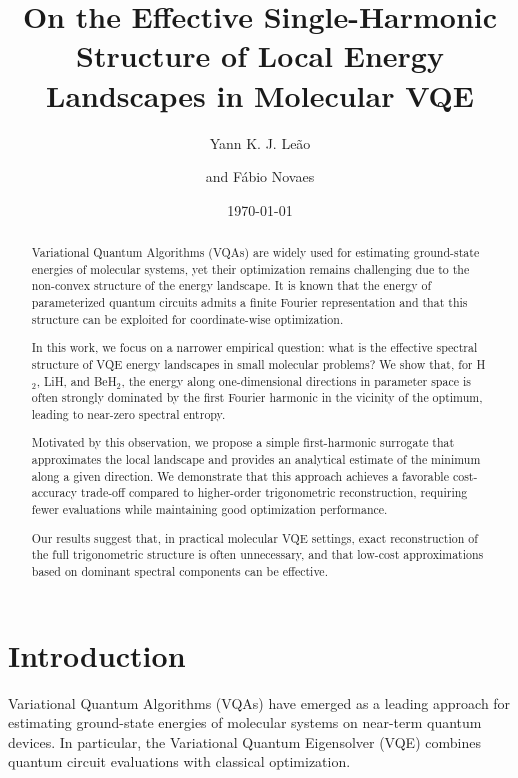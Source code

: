 \documentclass[12pt]{article}
\title{On the Effective Single-Harmonic Structure of Local Energy Landscapes in Molecular VQE}
\author[a]{Yann K. J. Leão}
\affiliation[a]{Academic Unit of Belo Jardim\\ Federal Rural University of Pernambuco}
\author[a]{and Fábio Novaes}
\date{\today}
\begin{document}
\maketitle

\begin{abstract}

Variational Quantum Algorithms (VQAs) are widely used for estimating ground-state energies of molecular systems, yet their optimization remains challenging due to the non-convex structure of the energy landscape. It is known that the energy of parameterized quantum circuits admits a finite Fourier representation and that this structure can be exploited for coordinate-wise optimization.

In this work, we focus on a narrower empirical question: what is the effective spectral structure of VQE energy landscapes in small molecular problems? We show that, for H$_2$, LiH, and BeH$_2$, the energy along one-dimensional directions in parameter space is often strongly dominated by the first Fourier harmonic in the vicinity of the optimum, leading to near-zero spectral entropy.

Motivated by this observation, we propose a simple first-harmonic surrogate that approximates the local landscape and provides an analytical estimate of the minimum along a given direction. We demonstrate that this approach achieves a favorable cost-accuracy trade-off compared to higher-order trigonometric reconstruction, requiring fewer evaluations while maintaining good optimization performance.

Our results suggest that, in practical molecular VQE settings, exact reconstruction of the full trigonometric structure is often unnecessary, and that low-cost approximations based on dominant spectral components can be effective.

\end{abstract}

\section{Introduction}

Variational Quantum Algorithms (VQAs) have emerged as a leading approach for estimating ground-state energies of molecular systems on near-term quantum devices. In particular, the Variational Quantum Eigensolver (VQE) combines quantum circuit evaluations with classical optimization.
\end{document}
